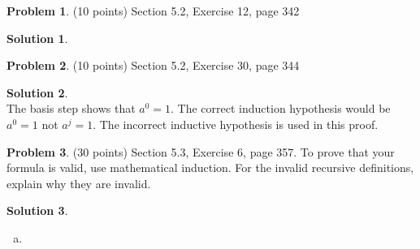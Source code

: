 \documentclass{article}
\theoremstyle{definition}
\newtheorem{problem}{Problem}
\newtheorem*{solution}{Solution}
\begin{document}
\begin{problem} (10 points)
Section 5.2, Exercise 12, page 342
\end{problem}
\begin{solution}
\end{solution}

\begin{problem} (10 points)
Section 5.2, Exercise 30, page 344
\end{problem}
\begin{solution}\ \\
The basis step shows that $a^0 = 1$. The correct induction hypothesis would be $a^0 = 1$ not $a^j = 1$. The incorrect inductive hypothesis is used in this proof.
\end{solution}

\begin{problem} (30 points)
Section 5.3, Exercise 6, page 357.
To prove that your formula is valid, use mathematical induction.
For the invalid recursive definitions, explain why they are invalid.
\end{problem}
\begin{solution} \ \\
\begin{enumerate}[a)]
  \item 
\end{enumerate}
\end{solution}
\end{document}
